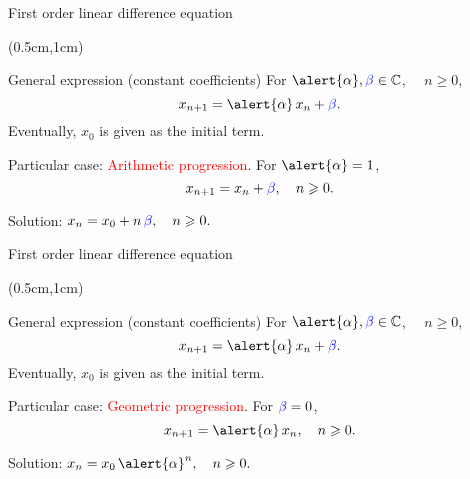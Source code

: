 \documentclass[xcolor=dvipsnames]{beamer} %
\begin{document}
	
	\begin{frame}{First order linear difference equation}
	
	\transwipe
	
	\begin{textblock*}{12cm}(0.5cm,1cm)
	
	\begin{block}{General expression (constant coefficients)}
	For $\alert{\alpha}, \textcolor{blue}{\beta} \in \mathbb{C}$, $\quad n\geqslant 0$,
	\begin{equation*}
	x_{n+1} = \alert{\alpha} \, x_n + \textcolor{blue}{\beta}.
	\end{equation*}
	Eventually, $x_0$ is given as the initial term.
	\end{block}
	
	\end{textblock*}
	
	\vspace{3cm}
	
	Particular case:  \textcolor{red}{Arithmetic progression}.  For $\alert{\alpha} = 1$,
	$$
	x_{n+1} = x_n + \textcolor{blue}{\beta}, \quad n\geqslant 0.
	$$
	
	\vspace{1cm}
	
	Solution: \quad $x_{n} = x_0 + n\,\textcolor{blue}{\beta}, \quad n\geqslant 0.$
	 
	\end{frame}
	
	
	\begin{frame}{First order linear difference equation}
	
	\transwipe
	
	\begin{textblock*}{12cm}(0.5cm,1cm)
	
	\begin{block}{General expression (constant coefficients)}
	For $\alert{\alpha}, \textcolor{blue}{\beta} \in \mathbb{C}$, $\quad n\geqslant 0$,
	\begin{equation*}
	x_{n+1} = \alert{\alpha} \, x_n + \textcolor{blue}{\beta}.
	\end{equation*}
	Eventually, $x_0$ is given as the initial term.
	\end{block}
	
	\end{textblock*}
	
	\vspace{3cm}
	
	
	Particular case: \textcolor{red}{Geometric progression}.  For $\textcolor{blue}{\beta} = 0$, 
	$$
	x_{n+1} = \alert{\alpha}\, x_n, \quad n\geqslant 0.
	$$
	
	\vspace{1cm}
	
	Solution: \quad $x_{n} = x_0 \, \alert{\alpha}^n, \quad n\geqslant 0.$
	
	
	\end{frame}
	
\end{document}
